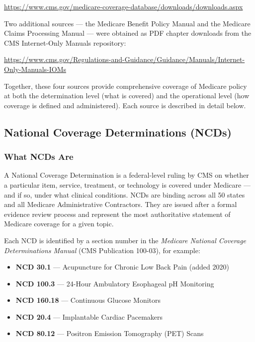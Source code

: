 \documentclass[10pt, letterpaper]{article}
\begin{document}
\begin{center}
    \url{https://www.cms.gov/medicare-coverage-database/downloads/downloads.aspx}
\end{center}
 
Two additional sources --- the Medicare Benefit Policy Manual and the Medicare Claims
Processing Manual --- were obtained as PDF chapter downloads from the CMS Internet-Only
Manuals repository:
 
\begin{center}
    \url{https://www.cms.gov/Regulations-and-Guidance/Guidance/Manuals/Internet-Only-Manuals-IOMs}
\end{center}
 
Together, these four sources provide comprehensive coverage of Medicare policy at both
the determination level (what is covered) and the operational level (how coverage is
defined and administered). Each source is described in detail below.
 
\subsection{National Coverage Determinations (NCDs)}
 
\subsubsection{What NCDs Are}
 
A National Coverage Determination is a federal-level ruling by CMS on whether a
particular item, service, treatment, or technology is covered under Medicare --- and if
so, under what clinical conditions. NCDs are binding across all 50 states and all
Medicare Administrative Contractors. They are issued after a formal evidence review
process and represent the most authoritative statement of Medicare coverage for a given
topic.
 
Each NCD is identified by a section number in the \textit{Medicare National Coverage
Determinations Manual} (CMS Publication 100-03), for example:
 
\begin{itemize}[noitemsep, topsep=4pt]
    \item \textbf{NCD 30.1} --- Acupuncture for Chronic Low Back Pain (added 2020)
    \item \textbf{NCD 100.3} --- 24-Hour Ambulatory Esophageal pH Monitoring
    \item \textbf{NCD 160.18} --- Continuous Glucose Monitors
    \item \textbf{NCD 20.4} --- Implantable Cardiac Pacemakers
    \item \textbf{NCD 80.12} --- Positron Emission Tomography (PET) Scans
\end{itemize}
 
\end{document}
